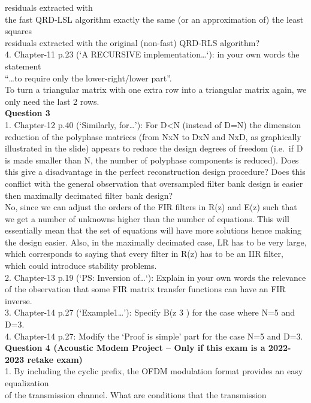 \documentclass[
  a4paper,
  ,captions=tableheading
]{scrartcl}
\begin{document}
residuals extracted with\\
the fast QRD-LSL algorithm exactly the same (or an approximation of) the
least squares\\
residuals extracted with the original (non-fast) QRD-RLS algorithm?\\
4. Chapter-11 p.23 (`A RECURSIVE implementation\ldots{}`): in your own
words the statement\\
``\ldots to require only the lower-right/lower part''.\\
To turn a triangular matrix with one extra row into a triangular matrix
again, we only need the last 2 rows.\\
\textbf{Question 3}\\
1. Chapter-12 p.40 (`Similarly, for\ldots{}'): For D\textless N (instead
of D=N) the dimension reduction of the polyphase matrices (from NxN to
DxN and NxD, as graphically illustrated in the slide) appears to reduce
the design degrees of freedom (i.e.~if D is made smaller than N, the
number of polyphase components is reduced). Does this give a
disadvantage in the perfect reconstruction design procedure? Does this
conflict with the general observation that oversampled filter bank
design is easier then maximally decimated filter bank design?\\
No, since we can adjust the orders of the FIR filters in R(z) and E(z)
such that we get a number of unknowns higher than the number of
equations. This will essentially mean that the set of equations will
have more solutions hence making the design easier. Also, in the
maximally decimated case, LR has to be very large, which corresponds to
saying that every filter in R(z) has to be an IIR filter, which could
introduce stability problems.\\
2. Chapter-13 p.19 (`PS: Inversion of\ldots{}`): Explain in your own
words the relevance of the observation that some FIR matrix transfer
functions can have an FIR inverse.\\
3. Chapter-14 p.27 (`Example1\ldots{}'): Specify B(z 3 ) for the case
where N=5 and D=3.\\
4. Chapter-14 p.27: Modify the `Proof is simple' part for the case N=5
and D=3.\\
\textbf{Question 4 (Acoustic Modem Project -- Only if this exam is a
2022-2023 retake exam)}\\
1. By including the cyclic prefix, the OFDM modulation format provides
an easy equalization\\
of the transmission channel. What are conditions that the transmission
\end{document}
